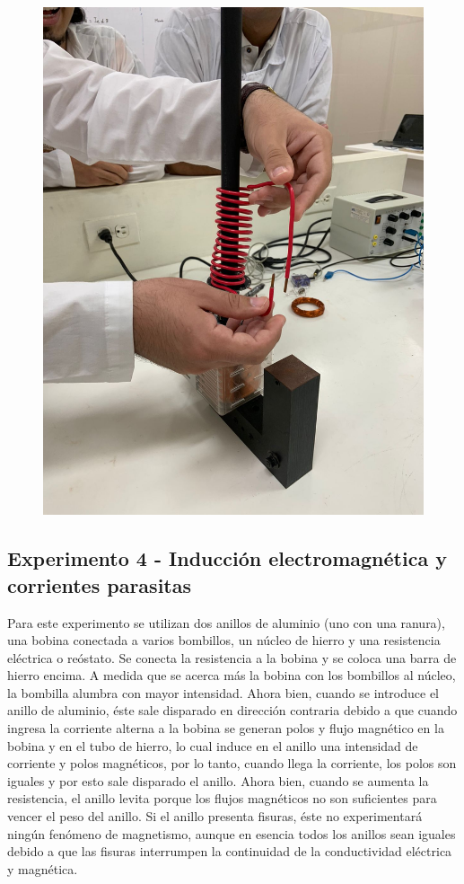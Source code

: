 \documentclass[twocolumn, 12pt]{article}
\begin{document}
\begin{figure}[H]
	\includegraphics[width=0.9\linewidth]{./Images/DIFPotencial.jpeg}
\end{figure}

\subsection*{Experimento 4 - Inducción electromagnética y corrientes parasitas}

Para este experimento se utilizan dos anillos de aluminio
(uno con una ranura), una bobina conectada a varios
bombillos, un núcleo de hierro y una resistencia eléctrica
o reóstato. Se conecta la resistencia a la bobina y se
coloca una barra de hierro encima. A medida que se acerca
más la bobina con los bombillos al núcleo, la bombilla
alumbra con mayor intensidad. Ahora bien, cuando se
introduce el anillo de aluminio, éste sale disparado en
dirección contraria debido a que cuando ingresa la
corriente alterna a la bobina se generan polos y flujo
magnético en la bobina y en el tubo de hierro, lo cual
induce en el anillo una intensidad de corriente y polos
magnéticos, por lo tanto, cuando llega la corriente, los
polos son iguales y por esto sale disparado el anillo.
Ahora bien, cuando se aumenta la resistencia, el anillo
levita porque los flujos magnéticos no son suficientes para
vencer el peso del anillo. Si el anillo presenta fisuras,
éste no experimentará ningún fenómeno de magnetismo, aunque
en esencia todos los anillos sean iguales debido a que las
fisuras interrumpen la continuidad de la conductividad
eléctrica y magnética.
\end{document}
